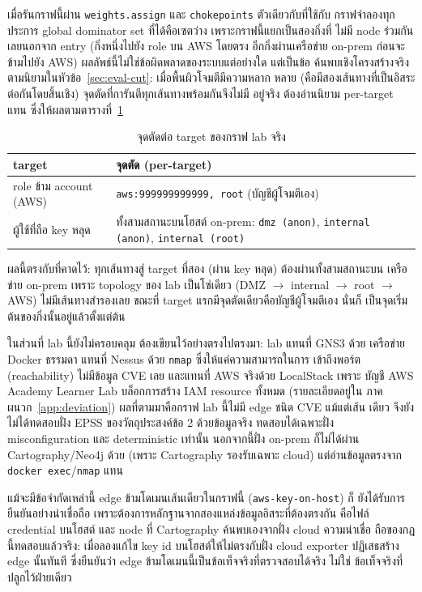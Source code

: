เมื่อรันกราฟนี้ผ่าน \texttt{weights.assign} และ \texttt{chokepoints} ตัวเดียวกับที่ใช้กับ
กราฟจำลองทุกประการ global dominator set ที่ได้คือเซตว่าง เพราะกราฟนี้แยกเป็นสองกิ่งที่
ไม่มี node ร่วมกันเลยนอกจาก entry (กิ่งหนึ่งไปยัง role บน AWS โดยตรง อีกกิ่งผ่านเครือข่าย
on-prem ก่อนจะข้ามไปยัง AWS) ผลลัพธ์นี้ไม่ใช่ข้อผิดพลาดของระบบแต่อย่างใด แต่เป็นข้อ
ค้นพบเชิงโครงสร้างจริงตามนิยามในหัวข้อ~\ref{sec:eval-cut}: เมื่อพื้นผิวโจมตีมีความหลาก
หลาย (คือมีสองเส้นทางที่เป็นอิสระต่อกันโดยสิ้นเชิง) จุดตัดที่การันตีทุกเส้นทางพร้อมกันจึงไม่มี
อยู่จริง ต้องอ่านนิยาม per-target แทน ซึ่งให้ผลตามตารางที่~\ref{tab:labpt}

\begin{table}[H]
\centering
\caption{จุดตัดต่อ target ของกราฟ lab จริง}\label{tab:labpt}
\small
\begin{tabular}{lp{7cm}}
\toprule
target & จุดตัด (per-target) \\
\midrule
role ข้าม account (AWS) & \texttt{aws:999999999999, root} (บัญชีผู้โจมตีเอง) \\
ผู้ใช้ที่ถือ key หลุด & ทั้งสามสถานะบนโฮสต์ on-prem: \texttt{dmz (anon)}, \texttt{internal (anon)}, \texttt{internal (root)} \\
\bottomrule
\end{tabular}
\end{table}

ผลนี้ตรงกับที่คาดไว้: ทุกเส้นทางสู่ target ที่สอง (ผ่าน key หลุด) ต้องผ่านทั้งสามสถานะบน
เครือข่าย on-prem เพราะ topology ของ lab เป็นโซ่เดียว (DMZ $\to$ internal $\to$ root
$\to$ AWS) ไม่มีเส้นทางสำรองเลย ขณะที่ target แรกมีจุดตัดเดียวคือบัญชีผู้โจมตีเอง นั่นก็
เป็นจุดเริ่มต้นของกิ่งนั้นอยู่แล้วตั้งแต่ต้น

ในส่วนที่ lab นี้ยังไม่ครอบคลุม ต้องเขียนไว้อย่างตรงไปตรงมา: lab แทนที่ GNS3 ด้วย
เครือข่าย Docker ธรรมดา แทนที่ Nessus ด้วย \texttt{nmap} ซึ่งให้แค่ความสามารถในการ
เข้าถึงพอร์ต (reachability) ไม่มีข้อมูล CVE เลย และแทนที่ AWS จริงด้วย LocalStack เพราะ
บัญชี AWS Academy Learner Lab บล็อกการสร้าง IAM resource ทั้งหมด (รายละเอียดอยู่ใน
ภาคผนวก~\ref{app:deviation}) ผลที่ตามมาคือกราฟ lab นี้ไม่มี edge ชนิด CVE แม้แต่เส้น
เดียว จึงยังไม่ได้ทดสอบฝั่ง EPSS ของวัตถุประสงค์ข้อ 2 ด้วยข้อมูลจริง ทดสอบได้เฉพาะฝั่ง
misconfiguration และ deterministic เท่านั้น นอกจากนี้ฝั่ง on-prem ก็ไม่ได้ผ่าน
Cartography/Neo4j ด้วย (เพราะ Cartography รองรับเฉพาะ cloud) แต่อ่านข้อมูลตรงจาก
\texttt{docker exec}/\texttt{nmap} แทน

แม้จะมีข้อจำกัดเหล่านี้ edge ข้ามโดเมนเส้นเดียวในกราฟนี้ (\texttt{aws-key-on-host}) ก็
ยังได้รับการยืนยันอย่างน่าเชื่อถือ เพราะต้องการหลักฐานจากสองแหล่งข้อมูลอิสระที่ต้องตรงกัน
คือไฟล์ credential บนโฮสต์ และ node ที่ Cartography ค้นพบเองจากฝั่ง cloud ความน่าเชื่อ
ถือของกฎนี้ทดสอบแล้วจริง: เมื่อลองแก้ไข key id บนโฮสต์ให้ไม่ตรงกับฝั่ง cloud exporter
ปฏิเสธสร้าง edge นั้นทันที ซึ่งยืนยันว่า edge ข้ามโดเมนนี้เป็นข้อเท็จจริงที่ตรวจสอบได้จริง ไม่ใช่
ข้อเท็จจริงที่ปลูกไว้ฝ่ายเดียว

